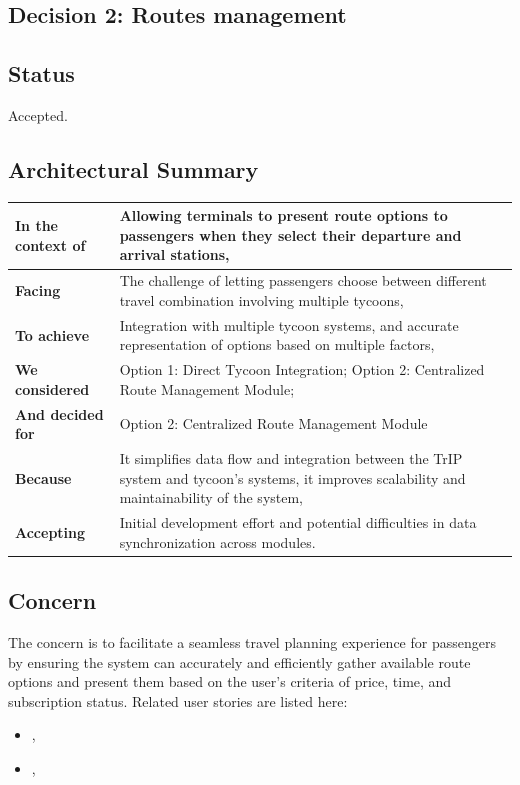 \subsection{Decision 2: Routes management}

\subsection*{Status}
Accepted.

\subsection*{Architectural Summary}
\begin{tabular}{|p{3.5cm}|p{10.5cm}|}
    \hline
    \textbf{In the context of} & Allowing terminals to present route options to passengers when they select their departure and arrival stations, \\
    \hline
    \textbf{Facing} & The challenge of letting passengers choose between different travel combination involving multiple tycoons, \\
    \hline
    \textbf{To achieve} & Integration with multiple tycoon systems, and accurate representation of options based on multiple factors, \\
    \hline
    \textbf{We considered} & Option 1: Direct Tycoon Integration; Option 2: Centralized Route Management Module; \\
    \hline
    \textbf{And decided for} & Option 2: Centralized Route Management Module \\
    \hline
    \textbf{Because} & It simplifies data flow and integration between the TrIP system and tycoon's systems, it improves scalability and maintainability of the system, \\
    \hline
    \textbf{Accepting} & Initial development effort and potential difficulties in data synchronization across modules. \\
    \hline
\end{tabular}

\subsection*{Concern}
The concern is to facilitate a seamless travel planning experience for passengers by ensuring the system can accurately and efficiently gather available route options and present them based on the user's criteria of price, time, and subscription status.
Related user stories are listed here:
\begin{itemize}[noitemsep]
    \item \userStorySixteen,
    \item \userStoryTwentySix,
\end{itemize}

